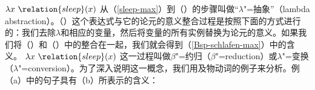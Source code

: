 \ea
$\lambda x~\relation{sleep}(x)$
\z
%
从（\ref{sleep-max}）到（）的步骤叫做“$\lambda$"=抽象”（lambda abstraction）。（）这个表达式与它的论元的意义整合过程是按照下面的方式进行的：我们去除$\lambda$和相应的变量，然后将变量的所有实例替换为论元的意义。如果我们将（）和（）中的整合在一起，我们就会得到（\ref{Bsp-schlafen-max}）中的含义。
\ea
$\lambda x~\relation{sleep}(x)$ 
\z
这一过程叫做$\beta$"=约归（$\beta$"=reduction）或$\lambda$"=变换（$\lambda$"=conversion）。为了深入说明这一概念，我们用及物动词的例子来分析。例（a）中的句子具有（b）所表示的含义：
\eal
\ex\label{Bsp-Max-mag-Lotte} 
